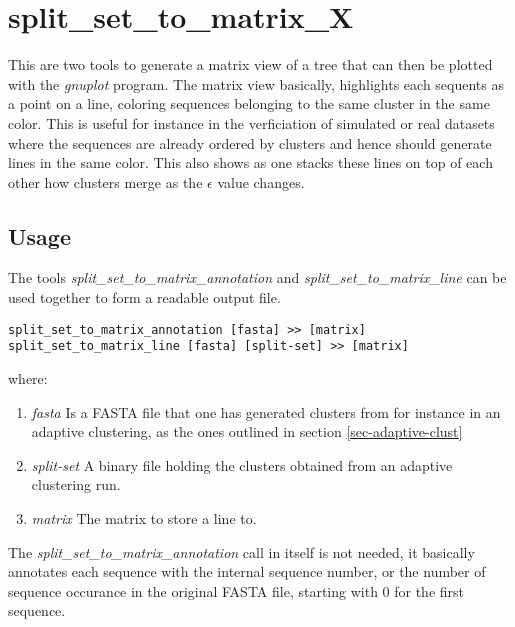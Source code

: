 \section{split\_set\_to\_matrix\_X}

This are two tools to generate a matrix view of a tree that can then be
plotted with the \emph{gnuplot} \cite{gnuplot} program. The matrix
view basically, highlights each sequents as a point on a line,
coloring sequences belonging to the same cluster in the same
color. This is useful for instance in the verficiation of simulated or
real datasets where the sequences are already ordered by clusters and
hence should generate lines in the same color. This also shows as one
stacks these lines on top of each other how clusters merge as the
$\epsilon$ value changes.

\subsection{Usage}

The tools \emph{split\_set\_to\_matrix\_annotation} and
\emph{split\_set\_to\_matrix\_line} can be used together to form a
readable output file. 

\begin{lstlisting}
split_set_to_matrix_annotation [fasta] >> [matrix]
split_set_to_matrix_line [fasta] [split-set] >> [matrix]
\end{lstlisting}
where:
\begin{enumerate}
  \item \emph{fasta} Is a FASTA file that one has generated clusters
    from for instance in an adaptive clustering, as the ones outlined
    in section \ref{sec-adaptive-clust}
  \item \emph{split-set} A binary file holding the clusters obtained
    from an adaptive clustering run.
  \item \emph{matrix} The matrix to store a line to.
\end{enumerate}
The \emph{split\_set\_to\_matrix\_annotation} call in itself is not
needed, it basically annotates each sequence with the internal
sequence number, or the number of sequence occurance in the original
FASTA file, starting with 0 for the first sequence.

